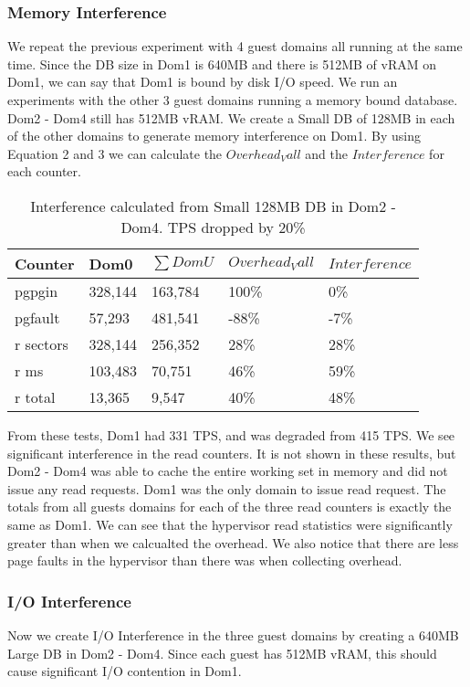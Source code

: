 \subsubsection{Memory Interference}
We repeat the previous experiment with 4 guest domains all running at the same time.
Since the DB size in Dom1 is 640MB and there is 512MB of vRAM on Dom1, we can say that Dom1 is bound by disk I/O speed.
We run an experiments with the other 3 guest domains running a memory bound database.  Dom2 - Dom4 still has 512MB vRAM.  
We create a Small DB of 128MB in each of the other domains to generate memory interference on Dom1.
By using Equation 2 and 3 we can calculate the $Overhead_Vall$ and the $Interference$ for each counter.

\begin{table}[h]
\begin{tabular}{ l l l l p{5cm} }
  Counter & Dom0 & $\sum{DomU}$ & $Overhead_Vall$ & $Interference$ \\
  \hline
	pgpgin    & 328,144 & 163,784 & 100\% &   0\% \\
	pgfault   &  57,293 & 481,541 & -88\% &  -7\% \\
	r sectors & 328,144 & 256,352 &  28\% &  28\% \\
	r ms      & 103,483 &  70,751 &  46\% &  59\% \\
	r total   &  13,365 &   9,547 &  40\% &  48\% \\
  \hline
\end{tabular}
\caption{Interference calculated from Small 128MB DB in Dom2 - Dom4.  TPS dropped by 20\%} 
\label{fig:InterferenceSm}
\end{table}

From these tests, Dom1 had 331 TPS, and was degraded from 415 TPS.  We see significant interference in the read counters.  It is not shown in these results, but Dom2 - Dom4 was able to cache the entire working set in memory and did not issue any read requests.  Dom1 was the only domain to issue read request. The totals from all guests domains for each of the three read counters is exactly the same as Dom1.  We can see that the hypervisor read statistics were significantly greater than when we calcualted the overhead.  We also notice that there are less page faults in the hypervisor than there was when collecting overhead.

\subsubsection{I/O Interference}
Now we create I/O Interference in the three guest domains by creating a 640MB Large DB in Dom2 - Dom4.  Since each guest has 512MB vRAM, this should cause significant I/O contention in Dom1.

